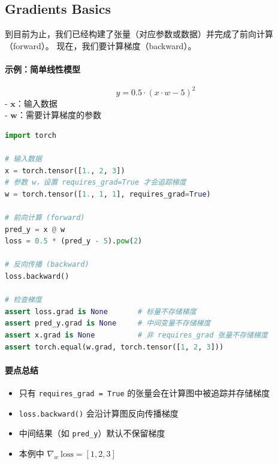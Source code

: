 
\clearpage
\subsection{Gradients Basics}

到目前为止，我们已经构建了张量（对应参数或数据）并完成了前向计算（forward）。  
现在，我们要计算梯度（backward）。  

\paragraph{示例：简单线性模型}  
\[
y = 0.5 \cdot (x \cdot w - 5)^2
\]
- \(\mathbf{x}\)：输入数据  \\
- \(\mathbf{w}\)：需要计算梯度的参数


\begin{lstlisting}[language=Python]
import torch

# 输入数据
x = torch.tensor([1., 2, 3])
# 参数 w，设置 requires_grad=True 才会追踪梯度
w = torch.tensor([1., 1, 1], requires_grad=True)

# 前向计算 (forward)
pred_y = x @ w
loss = 0.5 * (pred_y - 5).pow(2)

# 反向传播 (backward)
loss.backward()

# 检查梯度
assert loss.grad is None       # 标量不存储梯度
assert pred_y.grad is None     # 中间变量不存储梯度
assert x.grad is None          # 非 requires_grad 张量不存储梯度
assert torch.equal(w.grad, torch.tensor([1, 2, 3]))
\end{lstlisting}

\paragraph{要点总结}
\begin{itemize}
    \item 只有 \verb|requires_grad = True| 的张量会在计算图中被追踪并存储梯度
    \item \verb|loss.backward()| 会沿计算图反向传播梯度
    \item 中间结果（如 \verb|pred_y|）默认不保留梯度
    \item 本例中 \(\nabla_w \ \text{loss} = [1, 2, 3]\)
\end{itemize}

